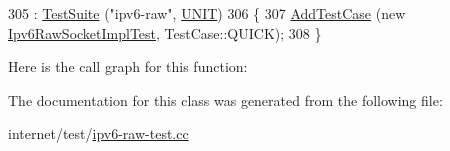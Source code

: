\begin{DoxyCode}
305                       : \hyperlink{classns3_1_1TestSuite_a904b0c40583b744d30908aeb94636d1a}{TestSuite} (\textcolor{stringliteral}{"ipv6-raw"}, \hyperlink{classns3_1_1TestSuite_a1ebfcab34ec8161e085e8e3a1855eae0a3885375a3787abf60431f8454b3cadbd}{UNIT})
306   \{
307     \hyperlink{classns3_1_1TestCase_a3718088e3eefd5d6454569d2e0ddd835}{AddTestCase} (\textcolor{keyword}{new} \hyperlink{classIpv6RawSocketImplTest}{Ipv6RawSocketImplTest}, TestCase::QUICK);
308   \}
\end{DoxyCode}


Here is the call graph for this function\+:




The documentation for this class was generated from the following file\+:\begin{DoxyCompactItemize}
\item 
internet/test/\hyperlink{ipv6-raw-test_8cc}{ipv6-\/raw-\/test.\+cc}\end{DoxyCompactItemize}
